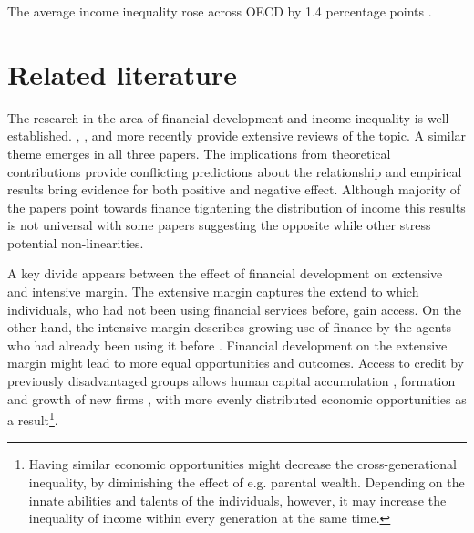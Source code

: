 \begin{refsection}
The average income inequality rose across \ac{OECD} by 1.4 percentage points \parencite{oecd2013crisis}.

\section{Related literature}
\label{ch4sec:literature}
The research in the area of financial development and income inequality is well established. \textcite{demirgucc2009finance}, \textcite{claessens2007finance}, and more recently \cite{de2017finance} provide extensive reviews of the topic. A similar theme emerges in all three papers. The implications from theoretical contributions provide conflicting predictions about the relationship and empirical results bring evidence for both positive and negative effect. Although majority of the papers point towards finance tightening the distribution of income this results is not universal with some papers suggesting the opposite while other stress potential non-linearities.

A key divide appears between the effect of financial development on extensive and intensive margin. The extensive margin captures the extend to which individuals, who had not been using financial services before, gain access. On the other hand, the intensive margin describes growing use of finance by the agents who had already been using it before \parencite{demirgucc2009finance}. Financial development on the extensive margin might lead to more equal opportunities and outcomes. Access to credit by previously disadvantaged groups allows human capital accumulation \parencite{galorzeira1993income, galormoav2004, braunetal2019}, formation and growth of new firms \parencite{evans1989estimated,banerjeenewman1990}, with more evenly distributed economic opportunities as a result\footnote{Having similar economic opportunities might decrease the cross-generational inequality, by diminishing the effect of e.g. parental wealth. Depending on the innate abilities and talents of the individuals, however, it may increase the inequality of income within every generation at the same time.}.


\end{refsection}
